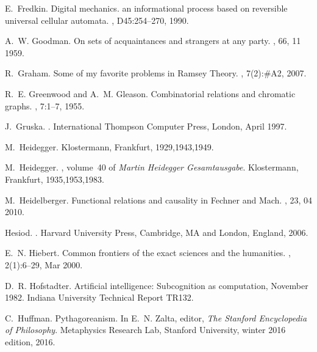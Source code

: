 \documentclass[12pt]{article}
\begin{document}
\begin{thebibliography}{10}
E.~Fredkin.
\newblock Digital mechanics. an informational process based on reversible
  universal cellular automata.
, D45:254--270, 1990.

A.~W. Goodman.
\newblock On sets of acquaintances and strangers at any party.
, 66, 11 1959.

R.~Graham.
\newblock Some of my favorite problems in {R}amsey {T}heory.
, 7(2):\#A2, 2007.

R.~E. Greenwood and A.~M. Gleason.
\newblock Combinatorial relations and chromatic graphs.
, 7:1--7, 1955.

J.~Gruska.
.
\newblock International Thompson Computer Press, London, April 1997.

M.~Heidegger.
\newblock Klostermann, Frankfurt, 1929,1943,1949.

M.~Heidegger.
, volume~40 of {\em {M}artin {H}eidegger
  {G}esamtausgabe}.
\newblock Klostermann, Frankfurt, 1935,1953,1983.

M.~Heidelberger.
\newblock Functional relations and causality in {F}echner and {M}ach.
, 23, 04 2010.

Hesiod.
.
\newblock Harvard University Press, Cambridge, MA and London, England, 2006.

E.~N. Hiebert.
\newblock Common frontiers of the exact sciences and the humanities.
, 2(1):6--29, Mar 2000.

D.~R. Hofstadter.
\newblock Artificial intelligence: {S}ubcognition as computation, November
  1982.
\newblock Indiana University Technical Report TR132.

C.~Huffman.
\newblock Pythagoreanism.
\newblock In E.~N. Zalta, editor, {\em The Stanford Encyclopedia of
  Philosophy}. Metaphysics Research Lab, Stanford University, winter 2016
  edition, 2016.


\end{thebibliography}
\end{document}
